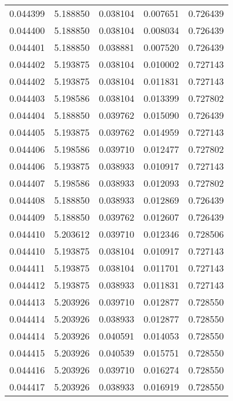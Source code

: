\begin{tabular}{lrrrr}
0.044399    &  5.188850 &  0.038104 &  0.007651 &             0.726439 \\
0.044400    &  5.188850 &  0.038104 &  0.008034 &             0.726439 \\
0.044401    &  5.188850 &  0.038881 &  0.007520 &             0.726439 \\
0.044402    &  5.193875 &  0.038104 &  0.010002 &             0.727143 \\
0.044402    &  5.193875 &  0.038104 &  0.011831 &             0.727143 \\
0.044403    &  5.198586 &  0.038104 &  0.013399 &             0.727802 \\
0.044404    &  5.188850 &  0.039762 &  0.015090 &             0.726439 \\
0.044405    &  5.193875 &  0.039762 &  0.014959 &             0.727143 \\
0.044406    &  5.198586 &  0.039710 &  0.012477 &             0.727802 \\
0.044406    &  5.193875 &  0.038933 &  0.010917 &             0.727143 \\
0.044407    &  5.198586 &  0.038933 &  0.012093 &             0.727802 \\
0.044408    &  5.188850 &  0.038933 &  0.012869 &             0.726439 \\
0.044409    &  5.188850 &  0.039762 &  0.012607 &             0.726439 \\
0.044410    &  5.203612 &  0.039710 &  0.012346 &             0.728506 \\
0.044410    &  5.193875 &  0.038104 &  0.010917 &             0.727143 \\
0.044411    &  5.193875 &  0.038104 &  0.011701 &             0.727143 \\
0.044412    &  5.193875 &  0.038933 &  0.011831 &             0.727143 \\
0.044413    &  5.203926 &  0.039710 &  0.012877 &             0.728550 \\
0.044414    &  5.203926 &  0.038933 &  0.012877 &             0.728550 \\
0.044414    &  5.203926 &  0.040591 &  0.014053 &             0.728550 \\
0.044415    &  5.203926 &  0.040539 &  0.015751 &             0.728550 \\
0.044416    &  5.203926 &  0.039710 &  0.016274 &             0.728550 \\
0.044417    &  5.203926 &  0.038933 &  0.016919 &             0.728550 \\

\end{tabular}
